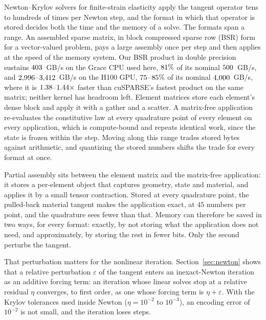 \documentclass[sigconf,balance=false]{acmart}
\newcommand{\eps}{\varepsilon}
\begin{document}
Newton--Krylov solvers for finite-strain elasticity apply the tangent operator tens to hundreds of
times per Newton step, and the format in which that operator is stored decides both the time and
the memory of a solve.  The formats span a range.  An assembled sparse matrix, in block compressed
sparse row (BSR) form for a vector-valued problem, pays a large assembly once per step and then
applies at the speed of the memory system.  Our BSR product in double precision sustains
$403$~GB/s on the Grace CPU used here, $81\%$ of its nominal
$500$~GB/s, and $2{,}996$--$3{,}412$~GB/s on the
H100 GPU, $75$--$85\%$ of its nominal
$4{,}000$~GB/s, where it is $1.38$--$1.44\times$
faster than cuSPARSE's fastest product on the same matrix; neither kernel has headroom left.
Element matrices store each element's dense block and apply it with a gather and a scatter.  A
matrix-free application re-evaluates the constitutive law at every quadrature point of every element
on every application, which is compute-bound and repeats identical work, since the state is frozen
within the step.  Moving along this range trades stored bytes against arithmetic, and quantizing the
stored numbers shifts the trade for every format at once.

Partial assembly sits between the element matrix and the matrix-free application: it stores a
per-element object that captures geometry, state and material, and applies it by a small tensor
contraction.  Stored at every quadrature point, the pulled-back material tangent makes the
application exact, at $45$ numbers per point, and the quadrature sees fewer than that.  Memory can
therefore be saved in two ways, for every format: exactly, by not storing what the application does
not need, and approximately, by storing the rest in fewer bits.  Only the second perturbs the
tangent.

That perturbation matters for the nonlinear iteration.  Section~\ref{sec:newton} shows that a
relative perturbation $\eps$ of the tangent enters an inexact-Newton iteration as an additive
forcing term: an iteration whose linear solves stop at a relative residual $\eta$ converges, to
first order, as one whose forcing term is $\eta+\eps$.  With the Krylov tolerances used inside
Newton ($\eta = 10^{-2}$ to $10^{-3}$), an encoding error of $10^{-2}$ is not small, and the
iteration loses steps.
\end{document}
